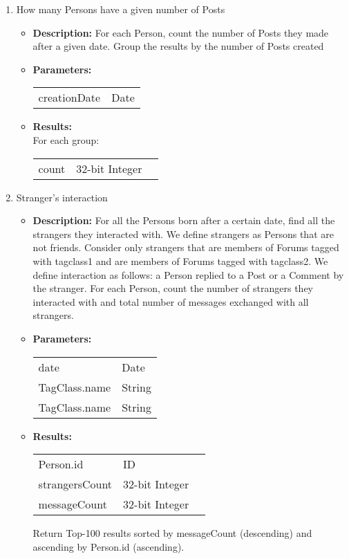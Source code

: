 {\begin{enumerate}
      \item How many Persons have a given number of Posts
            \begin{itemize}
                \item \textbf{Description:}
                  For each Person, count the number of Posts they made after a given date.
                  Group the results by the number of Posts created
                \item \textbf{Parameters:} \\
                    \begin{tabular}{ll}
                      creationDate & Date \\
                    \end{tabular}
                \item \textbf{Results:} \\
                  For each group:
                    \begin{tabular}{lll}
                      count & 32-bit Integer
                    \end{tabular}
                    \end{itemize}

                  \item Stranger's interaction
            \begin{itemize}
                \item \textbf{Description:}
For all the Persons born after a certain date, find all the strangers they interacted with. We define strangers as
Persons that are not friends.  Consider only strangers that are members of Forums tagged with tagclass1 and are members
of Forums tagged with tagclass2.  We define interaction as follows: a Person replied to a Post or a Comment by the
stranger.  For each Person, count the number of strangers they interacted with and total number of messages exchanged
with all strangers.
                \item \textbf{Parameters:} \\
                    \begin{tabular}{ll}
                      date & Date \\
                      TagClass.name & String \\
                      TagClass.name & String \\
                    \end{tabular}
                \item \textbf{Results:} \\
                    \begin{tabular}{lll}
                      Person.id & ID & \\
                      strangersCount & 32-bit Integer & \\
                      messageCount & 32-bit Integer & \\
                    \end{tabular}
                    Return Top-100 results sorted by messageCount (descending) and ascending by Person.id (ascending).
                    \end{itemize}


\end{enumerate}}
